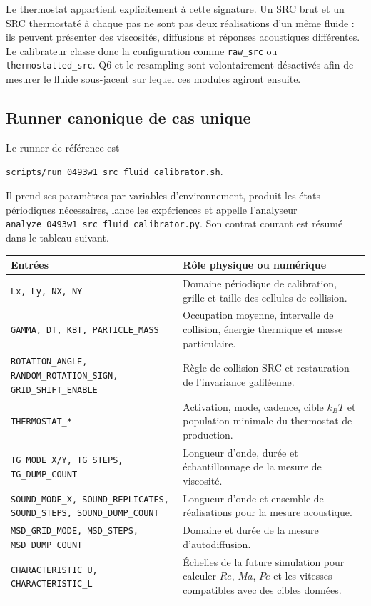 \documentclass[11pt,a4paper]{article}
\begin{document}
Le thermostat appartient explicitement à cette signature. Un SRC brut et un SRC thermostaté à chaque pas ne sont pas deux réalisations d'un même fluide : ils peuvent présenter des viscosités, diffusions et réponses acoustiques différentes. Le calibrateur classe donc la configuration comme \texttt{raw\_src} ou \texttt{thermostatted\_src}. Q6 et le resampling sont volontairement désactivés afin de mesurer le fluide sous-jacent sur lequel ces modules agiront ensuite.

\subsection{Runner canonique de cas unique}

Le runner de référence est
\begin{center}
  \texttt{scripts/run\_0493w1\_src\_fluid\_calibrator.sh}.
\end{center}
Il prend ses paramètres par variables d'environnement, produit les états périodiques nécessaires, lance les expériences et appelle l'analyseur \texttt{analyze\_0493w1\_src\_fluid\_calibrator.py}. Son contrat courant est résumé dans le tableau suivant.

\begin{center}
\small
\begin{tabular}{p{}p{}}
\toprule
Entrées & Rôle physique ou numérique \\
\midrule
\texttt{Lx, Ly, NX, NY} & Domaine périodique de calibration, grille et taille des cellules de collision. \\
\texttt{GAMMA, DT, KBT, PARTICLE\_MASS} & Occupation moyenne, intervalle de collision, énergie thermique et masse particulaire. \\
\texttt{ROTATION\_ANGLE, RANDOM\_ROTATION\_SIGN, GRID\_SHIFT\_ENABLE} & Règle de collision SRC et restauration de l'invariance galiléenne. \\
\texttt{THERMOSTAT\_*} & Activation, mode, cadence, cible $k_BT$ et population minimale du thermostat de production. \\
\texttt{TG\_MODE\_X/Y, TG\_STEPS, TG\_DUMP\_COUNT} & Longueur d'onde, durée et échantillonnage de la mesure de viscosité. \\
\texttt{SOUND\_MODE\_X, SOUND\_REPLICATES, SOUND\_STEPS, SOUND\_DUMP\_COUNT} & Longueur d'onde et ensemble de réalisations pour la mesure acoustique. \\
\texttt{MSD\_GRID\_MODE, MSD\_STEPS, MSD\_DUMP\_COUNT} & Domaine et durée de la mesure d'autodiffusion. \\
\texttt{CHARACTERISTIC\_U, CHARACTERISTIC\_L} & Échelles de la future simulation pour calculer $Re$, $Ma$, $Pe$ et les vitesses compatibles avec des cibles données. \\
\bottomrule
\end{tabular}
\end{center}
\end{document}
